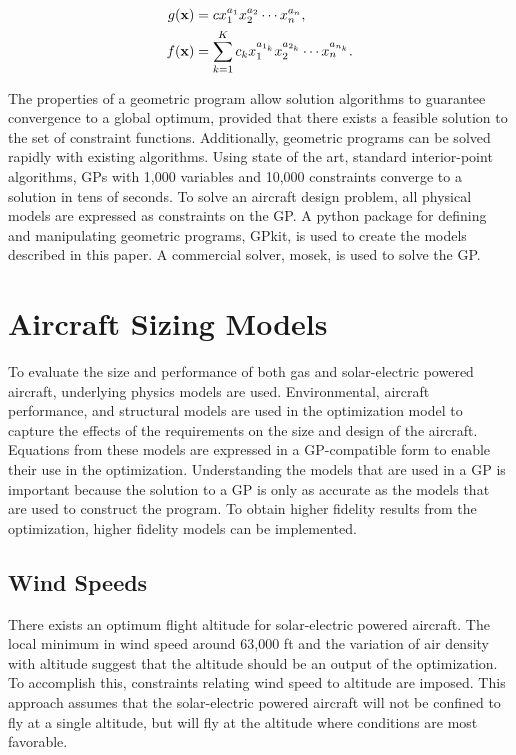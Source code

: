 \begin{align}
 \label{e:mon}
g(\bold{x}) &= c x_1^{a_1} x_2^{a_2} \dotsm x_n^{a_n} , \\
\label{e:pos}
f(\bold{x}) &= \displaystyle\sum_{k=1}^K c_k x_1^{a_{1_k}} x_2^{a_{2_k}} \dotsm x_n^{a_{n_k}}.
\end{align}

The properties of a geometric program allow solution algorithms to guarantee convergence to a global optimum, provided that there exists a feasible solution to the set of constraint functions.  
Additionally, geometric programs can be solved rapidly with existing algorithms.  
Using state of the art, standard interior-point algorithms, GPs with 1,000 variables and 10,000 constraints converge to a solution in tens of seconds.\cite{gp}  
To solve an aircraft design problem, all physical models are expressed as constraints on the GP.\cite{hoburgthesis} 
A python package for defining and manipulating geometric programs, GPkit\cite{gpkitdocs}, is used to create the models described in this paper.  A commercial solver, mosek\cite{mosek}, is used to solve the GP. \\

\section{Aircraft Sizing Models}

To evaluate the size and performance of both gas and solar-electric powered aircraft, underlying physics models are used.  
Environmental, aircraft performance, and structural models are used in the optimization model to capture the effects of the requirements on the size and design of the aircraft.
Equations from these models are expressed in a GP-compatible form to enable their use in the optimization. 
Understanding the models that are used in a GP is important because the solution to a GP is only as accurate as the models that are used to construct the program.  
To obtain higher fidelity results from the optimization, higher fidelity models can be implemented. 

\subsection{Wind Speeds}

There exists an optimum flight altitude for solar-electric powered aircraft.  
The local minimum in wind speed around 63,000 ft and the variation of air density with altitude suggest that the altitude should be an output of the optimization. 
To accomplish this, constraints relating wind speed to altitude are imposed. 
This approach assumes that the solar-electric powered aircraft will not be confined to fly at a single altitude, but will fly at the altitude where conditions are most favorable.

